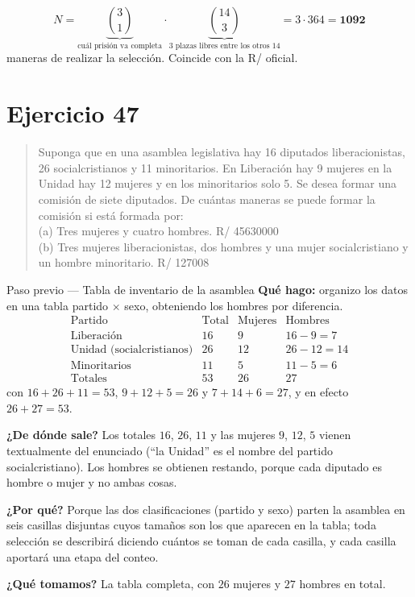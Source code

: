 \documentclass[11pt]{article}
\begin{document}
\begin{resp}
\[
N=\underbrace{\binom{3}{1}}_{\text{cu\'al prisi\'on va completa}}\cdot\underbrace{\binom{14}{3}}_{\text{3 plazas libres entre los otros 14}}=3\cdot 364=\mathbf{1092}
\]
maneras de realizar la selecci\'on. Coincide con la R/ oficial.
\end{resp}

\section*{Ejercicio 47}

\begin{quote}
Suponga que en una asamblea legislativa hay 16 diputados liberacionistas, 26 socialcristianos y 11
minoritarios. En Liberaci\'on hay 9 mujeres en la Unidad hay 12 mujeres y en los minoritarios solo 5. Se
desea formar una comisi\'on de siete diputados. De cu\'antas maneras se puede formar la comisi\'on si
est\'a formada por:\\
(a) Tres mujeres y cuatro hombres. \hfill R/ 45630000\\
(b) Tres mujeres liberacionistas, dos hombres y una mujer socialcristiano y un hombre minoritario.
\hfill R/ 127008
\end{quote}

\begin{paso}{Paso previo --- Tabla de inventario de la asamblea}
\textbf{Qu\'e hago:} organizo los datos en una tabla partido $\times$ sexo, obteniendo los hombres por
diferencia.
\[
\begin{array}{l|c|c|c}
\text{Partido} & \text{Total} & \text{Mujeres} & \text{Hombres}\\ \hline
\text{Liberaci\'on} & 16 & 9 & 16-9=7\\
\text{Unidad (socialcristianos)} & 26 & 12 & 26-12=14\\
\text{Minoritarios} & 11 & 5 & 11-5=6\\ \hline
\text{Totales} & 53 & 26 & 27
\end{array}
\]
con $16+26+11=53$, $9+12+5=26$ y $7+14+6=27$, y en efecto $26+27=53$.

\textbf{¿De d\'onde sale?} Los totales $16$, $26$, $11$ y las mujeres $9$, $12$, $5$ vienen textualmente del
enunciado (``la Unidad'' es el nombre del partido socialcristiano). Los hombres se obtienen restando, porque
cada diputado es hombre o mujer y no ambas cosas.

\textbf{¿Por qu\'e?} Porque las dos clasificaciones (partido y sexo) parten la asamblea en seis casillas
disjuntas cuyos tama\~nos son los que aparecen en la tabla; toda selecci\'on se describir\'a diciendo
cu\'antos se toman de cada casilla, y cada casilla aportar\'a una etapa del conteo.

\textbf{¿Qu\'e tomamos?} La tabla completa, con $26$ mujeres y $27$ hombres en total.
\end{paso}
\end{document}
